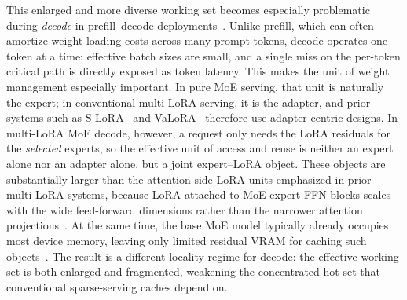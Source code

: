 \documentclass[sigplan,anonymous,review,nonacm]{acmart}
\begin{document}
This enlarged and more diverse working set becomes especially problematic during \emph{decode} in prefill--decode deployments~\cite{todo:pd-serving}. Unlike prefill, which can often amortize weight-loading costs across many prompt tokens, decode operates one token at a time: effective batch sizes are small, and a single miss on the per-token critical path is directly exposed as token latency. This makes the unit of weight management especially important. In pure MoE serving, that unit is naturally the expert; in conventional multi-LoRA serving, it is the adapter, and prior systems such as S-LoRA~\cite{todo:slora} and VaLoRA~\cite{mi2025empower} therefore use adapter-centric designs. In multi-LoRA MoE decode, however, a request only needs the LoRA residuals for the \emph{selected} experts, so the effective unit of access and reuse is neither an expert alone nor an adapter alone, but a joint expert--LoRA object. These objects are substantially larger than the attention-side LoRA units emphasized in prior multi-LoRA systems, because LoRA attached to MoE expert FFN blocks scales with the wide feed-forward dimensions rather than the narrower attention projections~\cite{todo:moe-ffn-architecture}. At the same time, the base MoE model typically already occupies most device memory, leaving only limited residual VRAM for caching such objects~\cite{todo:large-moe-models}. The result is a different locality regime for decode: the effective working set is both enlarged and fragmented, weakening the concentrated hot set that conventional sparse-serving caches depend on.
\end{document}
